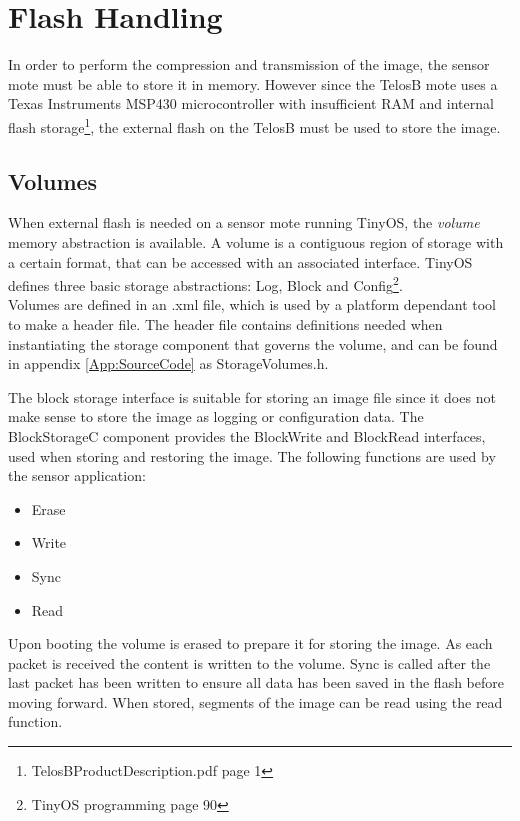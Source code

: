 \section{Flash Handling}

In order to perform the compression and transmission of the image, the sensor mote must be able to store it in memory. However since the TelosB mote uses a Texas Instruments  MSP430 microcontroller with insufficient RAM and internal flash storage\footnote{TelosBProductDescription.pdf\cite{telosbProductDesc} page 1}, the external flash on the TelosB must be used to store the image.

\subsection{Volumes}
When external flash is needed on a sensor mote running TinyOS, the \emph{volume} memory abstraction is available. A volume is a contiguous region of storage with a certain format, that can be accessed with an associated interface. TinyOS defines three basic storage abstractions: Log, Block and Config\footnote{TinyOS programming\cite{tinyOSprog} page 90}.
\\Volumes are defined in an .xml file, which is used by a platform dependant tool to make a header file. The header file contains definitions needed when instantiating the storage component that governs the volume, and can be found in appendix \ref{App:SourceCode} as StorageVolumes.h.   

The block storage interface is suitable for storing an image file since it does not make sense to store the image as logging or configuration data. The BlockStorageC component provides the BlockWrite and BlockRead interfaces, used when storing and restoring the image. The following functions are used by the sensor application:

\begin{itemize}
\item Erase
\item Write
\item Sync
\item Read
\end{itemize}  

Upon booting the volume is erased to prepare it for storing the image. As each packet is received the content is written to the volume. Sync is called after the last packet has been written to ensure all data has been saved in the flash before moving forward. When stored, segments of the image can be read using the read function.






 

   